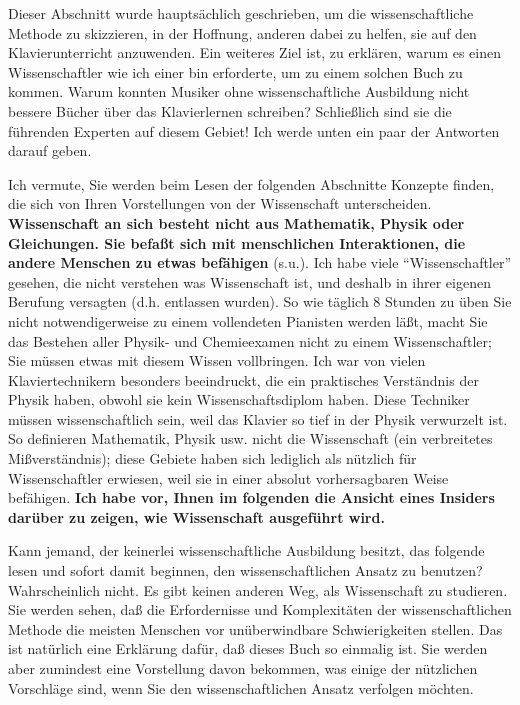 Dieser Abschnitt wurde hauptsächlich geschrieben, um die wissenschaftliche Methode zu skizzieren, in der Hoffnung, anderen dabei zu helfen, sie auf den Klavierunterricht anzuwenden.
 Ein weiteres Ziel ist, zu erklären, warum es einen Wissenschaftler wie ich einer bin erforderte, um zu einem solchen Buch zu kommen.
 Warum konnten Musiker ohne wissenschaftliche Ausbildung nicht bessere Bücher über das Klavierlernen schreiben?
 Schließlich sind sie die führenden Experten auf diesem Gebiet!
 Ich werde unten ein paar der Antworten darauf geben.
 

Ich vermute, Sie werden beim Lesen der folgenden Abschnitte Konzepte finden, die sich von Ihren Vorstellungen von der Wissenschaft unterscheiden.
 \textbf{Wissenschaft an sich besteht nicht aus Mathematik, Physik oder Gleichungen.
 Sie befaßt sich mit menschlichen Interaktionen, die andere Menschen zu etwas befähigen} (s.u.).
 Ich habe viele \enquote{Wissenschaftler} gesehen, die nicht verstehen was Wissenschaft ist, und deshalb in ihrer eigenen Berufung versagten (d.h. entlassen wurden).
 So wie täglich 8 Stunden zu üben Sie nicht notwendigerweise zu einem vollendeten Pianisten werden läßt, macht Sie das Bestehen aller Physik- und Chemieexamen nicht zu einem Wissenschaftler; Sie müssen etwas mit diesem Wissen vollbringen.
 Ich war von vielen Klaviertechnikern besonders beeindruckt, die ein praktisches Verständnis der Physik haben, obwohl sie kein Wissenschaftsdiplom haben.
 Diese Techniker müssen wissenschaftlich sein, weil das Klavier so tief in der Physik verwurzelt ist.
 So definieren Mathematik, Physik usw. nicht die Wissenschaft (ein verbreitetes Mißverständnis); diese Gebiete haben sich lediglich als nützlich für Wissenschaftler erwiesen, weil sie in einer absolut vorhersagbaren Weise befähigen.
 \textbf{Ich habe vor, Ihnen im folgenden die Ansicht eines Insiders darüber zu zeigen, wie Wissenschaft ausgeführt wird.}

Kann jemand, der keinerlei wissenschaftliche Ausbildung besitzt, das folgende lesen und sofort damit beginnen, den wissenschaftlichen Ansatz zu benutzen?
 Wahrscheinlich nicht.
 Es gibt keinen anderen Weg, als Wissenschaft zu studieren.
 Sie werden sehen, daß die Erfordernisse und Komplexitäten der wissenschaftlichen Methode die meisten Menschen vor unüberwindbare Schwierigkeiten stellen.
 Das ist natürlich eine Erklärung dafür, daß dieses Buch so einmalig ist.
 Sie werden aber zumindest eine Vorstellung davon bekommen, was einige der nützlichen Vorschläge sind, wenn Sie den wissenschaftlichen Ansatz verfolgen möchten.
 

